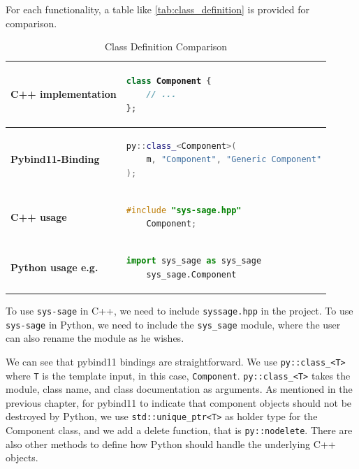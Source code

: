 For each functionality, a table like \autoref{tab:class_definition} is provided for comparison.
        
\begin{table}[ht]
\centering
\begin{tabular}{|l|l|}
\hline
\textbf{C++ implementation} &
\begin{lstlisting}[language=C++]
class Component {
    // ...
};
\end{lstlisting}
\\ \hline
\textbf{Pybind11-Binding} &
\begin{lstlisting}[language=C++]
py::class_<Component>(
    m, "Component", "Generic Component"
);
\end{lstlisting}
\\ \hline
\textbf{C++ usage} &
\begin{lstlisting}[language=C++]
    #include "sys-sage.hpp"
    Component;
\end{lstlisting}
    \\ \hline
\textbf{Python usage e.g.} &
\begin{lstlisting}[language=Python]
    import sys_sage as sys_sage
    sys_sage.Component
    \end{lstlisting}
    \\ \hline
\end{tabular}
\caption{Class Definition Comparison}
\label{tab:class_definition}
\end{table}

To use \verb|sys-sage| in C++, we need to include \verb|syssage.hpp| in the project. To use \verb|sys-sage| in Python, we need to include the \verb|sys_sage| module, where the user can also rename the module as he wishes. 

We can see that pybind11 bindings are straightforward. We use \verb|py::class_<T>| where \verb|T| is the template input, in this case, \verb|Component|. \verb|py::class_<T>| takes the module, class name, and class documentation as arguments. As mentioned in the previous chapter, for pybind11 to indicate that component objects should not be destroyed by Python, we use \verb|std::unique_ptr<T>| as holder type for the Component class, and we add a delete function, that is \verb|py::nodelete|. There are also other methods to define how Python should handle the underlying C++ objects.\cite{pybind11-docu}



